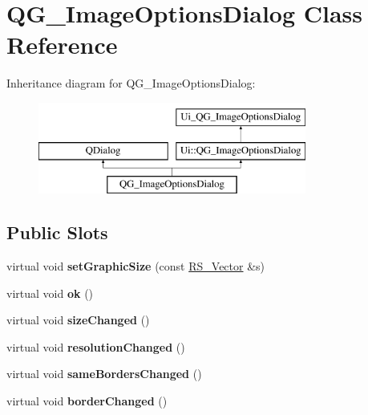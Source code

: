 \hypertarget{classQG__ImageOptionsDialog}{\section{Q\-G\-\_\-\-Image\-Options\-Dialog Class Reference}
\label{classQG__ImageOptionsDialog}
}
Inheritance diagram for Q\-G\-\_\-\-Image\-Options\-Dialog\-:\begin{figure}[H]
\begin{center}
\leavevmode
\includegraphics[height=3.000000cm]{classQG__ImageOptionsDialog}
\end{center}
\end{figure}
\subsection*{Public Slots}
\begin{DoxyCompactItemize}
\item 
\hypertarget{classQG__ImageOptionsDialog_aca592612831d1fd65f5fe1c70a4004a2}{virtual void {\bfseries set\-Graphic\-Size} (const \hyperlink{classRS__Vector}{R\-S\-\_\-\-Vector} \&s)}\label{classQG__ImageOptionsDialog_aca592612831d1fd65f5fe1c70a4004a2}

\item 
\hypertarget{classQG__ImageOptionsDialog_aa070aa2a3e659727b434997a643bc8d0}{virtual void {\bfseries ok} ()}\label{classQG__ImageOptionsDialog_aa070aa2a3e659727b434997a643bc8d0}

\item 
\hypertarget{classQG__ImageOptionsDialog_aa8044354490ea75882d1d629dd3dca2a}{virtual void {\bfseries size\-Changed} ()}\label{classQG__ImageOptionsDialog_aa8044354490ea75882d1d629dd3dca2a}

\item 
\hypertarget{classQG__ImageOptionsDialog_a8a0ce12c99675218bde4c3dc4364d45e}{virtual void {\bfseries resolution\-Changed} ()}\label{classQG__ImageOptionsDialog_a8a0ce12c99675218bde4c3dc4364d45e}

\item 
\hypertarget{classQG__ImageOptionsDialog_a982a0551ede44382545faf6ed8e72c84}{virtual void {\bfseries same\-Borders\-Changed} ()}\label{classQG__ImageOptionsDialog_a982a0551ede44382545faf6ed8e72c84}

\item 
\hypertarget{classQG__ImageOptionsDialog_afaeec69f45234429213596f45d6089ec}{virtual void {\bfseries border\-Changed} ()}\label{classQG__ImageOptionsDialog_afaeec69f45234429213596f45d6089ec}

\end{DoxyCompactItemize}
